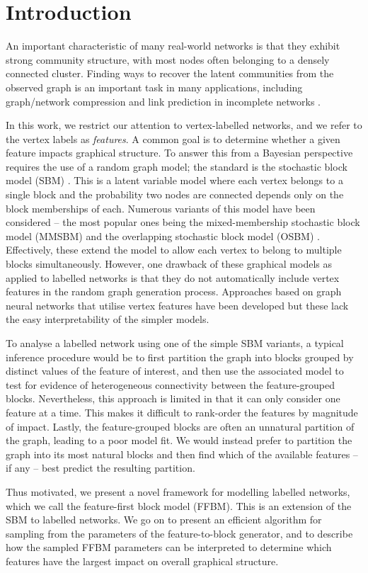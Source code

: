 \section{Introduction}

An important characteristic of many real-world networks is that they exhibit strong community structure, with most nodes often belonging to a densely connected cluster. 
Finding ways to recover the latent communities from the observed graph is an important
task in many applications, including
graph/network compression \cite{cluster-compression} and link prediction in 
incomplete networks \cite{link-prediction}.

In this work, we
restrict our attention to vertex-labelled networks, and we
refer to the vertex labels as {\em features}. A common goal is to determine whether a given feature impacts graphical structure. To answer this from a Bayesian perspective requires the use of a random graph model; the standard is the stochastic block model (SBM) \cite{vanilla-sbm}. This is a latent variable model where each vertex belongs to a single block and the probability two nodes are connected depends only on the block memberships of each. Numerous variants of this 
model have been considered -- the most popular ones being the mixed-membership stochastic block model (MMSBM) \cite{mixed-membership-sbm} and the overlapping stochastic block model (OSBM) \cite{overlapping-sbm}. Effectively, these extend the model to allow each vertex to belong to multiple blocks simultaneously. However, one drawback of these graphical models as applied to labelled networks is that they do not automatically include vertex features in the random graph generation process. Approaches based on graph neural networks \cite{sbm-gnn} that utilise vertex features have been developed but these lack the easy interpretability of the simpler models.

To analyse a labelled network using one of the simple SBM variants, a typical inference procedure would be to first partition the graph into blocks grouped by distinct values of the feature of interest, and then use the associated model to test for evidence of heterogeneous connectivity between the feature-grouped blocks. Nevertheless, this approach is limited in that it can only consider one feature at a time. This makes it difficult to rank-order the features by  magnitude of impact. Lastly, the feature-grouped blocks are often an unnatural partition of the graph, leading to a poor model fit. We would instead prefer to partition the graph into its most natural blocks and then find which of the available features -- if any -- best predict the resulting partition.

Thus motivated, we present a novel framework for modelling labelled networks, which we call the feature-first block model (FFBM). This is an extension of the SBM to labelled networks. We go on to present an efficient algorithm for sampling from the parameters of the feature-to-block generator, and to describe how the 
sampled FFBM parameters can be interpreted to determine which features have the largest impact on overall graphical structure.
